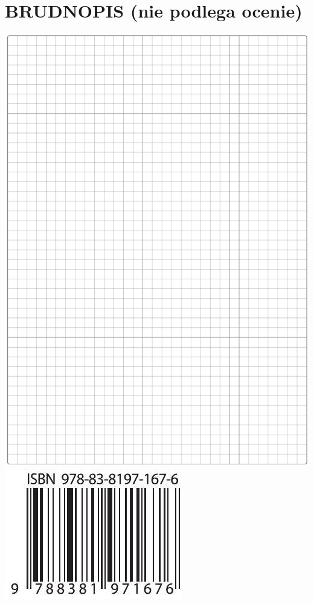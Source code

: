 \documentclass[10pt]{article}
\begin{document}
\section*{BRUDNOPIS (nie podlega ocenie)}
\includegraphics[max width=\textwidth, center]{2024_11_21_cdea326d19d0c2132b88g-19}\\
\includegraphics[max width=\textwidth, center]{2024_11_21_cdea326d19d0c2132b88g-20}
\end{document}
